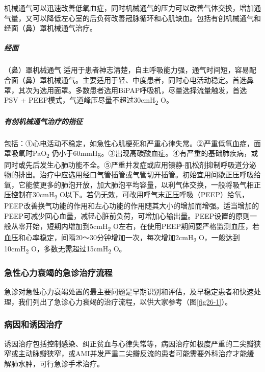机械通气可以迅速改善低氧血症，同时机械通气的压力可以改善气体交换，增加通气量，又可以降低左心室的后负荷改善冠脉循环和心肌缺血。包括有创机械通气和经面（鼻）罩机械通气治疗。

\subparagraph{经面}

（鼻）罩机械通气
适用于患者神志清楚，自主呼吸能力强，通气时间短，容易配合面（鼻）罩机械通气。主要适用于轻、中度患者，同时心电活动稳定。首选鼻罩，其次为选用面罩。多数患者选用BiPAP呼吸机，尽量选择流量触发，首选PSV
+ PEEP模式，气道峰压尽量不超过30cmH\textsubscript{2} O。

\subparagraph{有创机械通气治疗的指征}

包括：①心电活动不稳定，如急性心肌梗死和严重心律失常。②严重低氧血症，面罩吸氧时PaO\textsubscript{2}
仍小于60mmHg。③出现高碳酸血症。④有严重的基础肺疾病，或同时或先后发生心肺功能不全。⑤严重并发症或应用镇静-肌松剂抑制呼吸道分泌物的排出。治疗中应选用经口气管插管或气管切开插管。初始宜用间歇正压呼吸给氧，它能使更多的肺泡开放，加大肺泡平均容量，以利气体交换，一般将吸气相正压控制在30cmH\textsubscript{2}
O以下。若仍无效，可改用呼气末正压呼吸（PEEP）给氧，PEEP改善换气功能的作用和左心功能的作用随其大小的增加而增强。适当增加的PEEP可减少回心血量，减轻心脏前负荷，可增加心输出量。PEEP设置的原则一般从零开始，短期内增加到5cmH\textsubscript{2}
O左右，在使用PEEP期间要严格监测血压，若血压和心率稳定，间隔20～30分钟增加一次，每次增加2cmH\textsubscript{2}
O，一般达到10cmH\textsubscript{2} O，多数无需超过15cmH\textsubscript{2}
O。

\subsubsection{急性心力衰竭的急诊治疗流程}

急诊对急性心力衰竭处置的最主要问题是早期识别和评估，及早稳定患者和快速处理，我们列出了急诊心力衰竭的治疗流程，以供大家参考（图\ref{fig26-1}）。

\subsubsection{病因和诱因治疗}

诱因治疗包括控制感染、纠正贫血与心律失常等，病因治疗如极度严重的二尖瓣狭窄或主动脉瓣狭窄，或AMI并发严重二尖瓣反流的患者可能需要外科治疗才能缓解肺水肿，可行急诊手术治疗。

